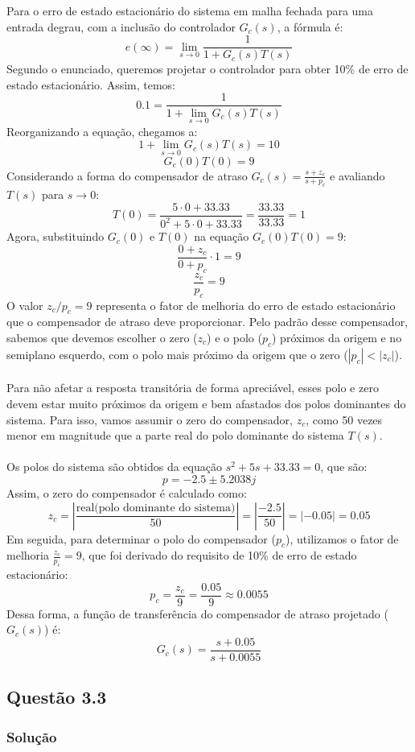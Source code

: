 \documentclass[a4paper,11pt]{article}
\begin{document}
Para o erro de estado estacionário do sistema em malha fechada para uma entrada degrau, com a inclusão do controlador $G_c(s)$, a fórmula é:
\[
    e(\infty) = \lim_{s \to 0} \frac{1}{1 + G_{c}(s)T(s)}
\]
Segundo o enunciado, queremos projetar o controlador para obter 10\% de erro de estado estacionário. Assim, temos:
\[
    0.1 = \frac{1}{1 + \lim_{s \to 0}G_{c}(s)T(s)}
\]
Reorganizando a equação, chegamos a:
\[
    1 + \lim_{s \to 0}G_{c}(s)T(s) = 10
\]
\[
    G_{c}(0)T(0) = 9
\]
Considerando a forma do compensador de atraso $G_c(s) =\frac{s + z_c}{s + p_c}$ e avaliando $T(s)$ para $s \to 0$:
\[
T(0) = \frac{5 \cdot 0 + 33.33}{0^2 + 5 \cdot 0 + 33.33} = \frac{33.33}{33.33} = 1
\]
Agora, substituindo $G_c(0)$ e $T(0)$ na equação $G_{c}(0)T(0) = 9$:
\[
\frac{0 + z_c}{0 + p_c} \cdot 1 = 9
\]
\[
\frac{z_c}{p_c} = 9
\]
O valor $z_c/p_c = 9$ representa o fator de melhoria do erro de estado estacionário que o compensador de atraso deve proporcionar. Pelo padrão desse compensador, sabemos que devemos escolher o zero ($z_c$) e o polo ($p_c$) próximos da origem e no semiplano esquerdo, com o polo mais próximo da origem que o zero ($|p_c| < |z_c|$).
\\\\
Para não afetar a resposta transitória de forma apreciável, esses polo e zero devem estar muito próximos da origem e bem afastados dos polos dominantes do sistema. Para isso, vamos assumir o zero do compensador, $z_c$, como 50 vezes menor em magnitude que a parte real do polo dominante do sistema $T(s)$.
\\\\
Os polos do sistema são obtidos da equação $s^2 + 5s + 33.33 = 0$, que são:
\[
    p = -2.5 \pm 5.2038j
\]
Assim, o zero do compensador é calculado como:
\[
    z_c = \left| \frac{\text{real}(\text{polo dominante do sistema)}}{50} \right| = \left| \frac{-2.5}{50} \right| = |-0.05| = 0.05
\]
Em seguida, para determinar o polo do compensador ($p_c$), utilizamos o fator de melhoria $\frac{z_c}{p_c} = 9$, que foi derivado do requisito de 10\% de erro de estado estacionário:
\[
p_c = \frac{z_c}{9} = \frac{0.05}{9} \approx 0.0055
\]
Dessa forma, a função de transferência do compensador de atraso projetado ($G_c(s)$) é:
\[
G_{c}(s) = \frac{s + 0.05}{s + 0.0055}
\]

\subsection*{\sc Questão 3.3}

\subsubsection*{\sc Solução}
\end{document}
